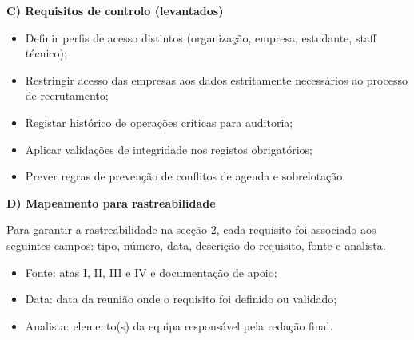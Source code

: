 \documentclass[12pt,a4paper]{article}
\begin{document}
\textbf{C) Requisitos de controlo (levantados)}
\begin{itemize}[leftmargin=1.5cm]
    \item Definir perfis de acesso distintos (organização, empresa, estudante,
    staff técnico);
    \item Restringir acesso das empresas aos dados estritamente necessários ao
    processo de recrutamento;
    \item Registar histórico de operações críticas para auditoria;
    \item Aplicar validações de integridade nos registos obrigatórios;
    \item Prever regras de prevenção de conflitos de agenda e sobrelotação.
\end{itemize}

\textbf{D) Mapeamento para rastreabilidade}

Para garantir a rastreabilidade na secção 2, cada requisito foi associado aos
seguintes campos: tipo, número, data, descrição do requisito, fonte e analista.

\begin{itemize}[leftmargin=1.5cm]
    \item Fonte: atas I, II, III e IV e documentação de apoio;
    \item Data: data da reunião onde o requisito foi definido ou validado;
    \item Analista: elemento(s) da equipa responsável pela redação final.
\end{itemize}
\end{document}
